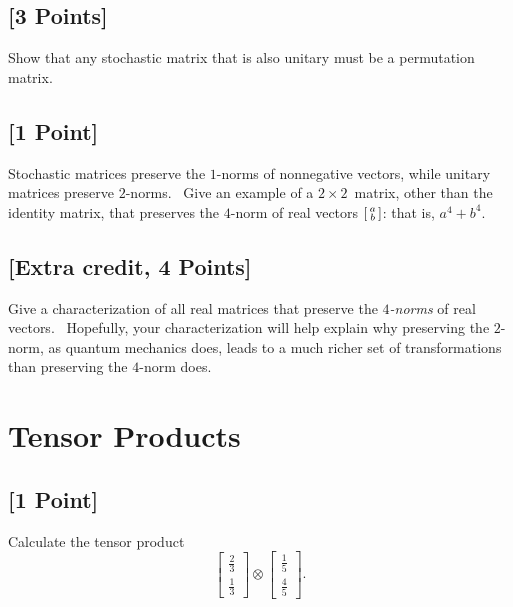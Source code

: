 \documentclass[11pt]{article}
\begin{document}
\subsection{[3 Points]} Show that any stochastic matrix that is also unitary must be a permutation matrix. 


\subsection{[1 Point]} Stochastic matrices preserve the $1$-norms of nonnegative vectors, while
unitary matrices preserve $2$-norms. \ Give an example of a $2\times
2$\ matrix, other than the identity matrix, that preserves the $4$-norm of
real vectors $\begin{bsmallmatrix} a\\b\end{bsmallmatrix}$: that is, $a^{4}+b^{4}$.


\subsection{[Extra credit, 4 Points]} Give a characterization of all real matrices that preserve the
$4$\textit{-norms} of real vectors. \ Hopefully, your characterization will
help explain why preserving the $2$-norm, as quantum mechanics does, leads to
a much richer set of transformations than preserving the $4$-norm does.


\section{Tensor Products}

\subsection{[1 Point]} Calculate the tensor product 
\[
\begin{bmatrix}
\frac{2}{3}\\[0.1em]
\frac{1}{3}
\end{bmatrix}\otimes
\begin{bmatrix}
\frac{1}{5}\\[0.1em]
\frac{4}{5}
\end{bmatrix}.
\]
\end{document}
